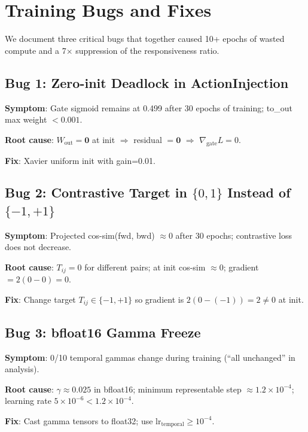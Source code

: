 \documentclass[10pt,twocolumn]{article}
\begin{document}
\section{Training Bugs and Fixes}

We document three critical bugs that together caused 10+ epochs of wasted compute and a 7$\times$ suppression of the responsiveness ratio.

\subsection{Bug 1: Zero-init Deadlock in ActionInjection}

\textbf{Symptom}: Gate sigmoid remains at 0.499 after 30 epochs of training; to\_out max weight $< 0.001$.

\textbf{Root cause}: $W_\text{out} = \mathbf{0}$ at init $\Rightarrow$ residual $= \mathbf{0}$ $\Rightarrow$ $\nabla_\text{gate} L = 0$.

\textbf{Fix}: Xavier uniform init with gain=0.01.

\subsection{Bug 2: Contrastive Target in $\{0,1\}$ Instead of $\{-1,+1\}$}

\textbf{Symptom}: Projected cos-sim(fwd, bwd) $\approx 0$ after 30 epochs; contrastive loss does not decrease.

\textbf{Root cause}: $T_{ij} = 0$ for different pairs; at init cos-sim $\approx 0$; gradient $= 2(0 - 0) = 0$.

\textbf{Fix}: Change target $T_{ij} \in \{-1, +1\}$ so gradient is $2(0-(-1)) = 2 \neq 0$ at init.

\subsection{Bug 3: bfloat16 Gamma Freeze}

\textbf{Symptom}: 0/10 temporal gammas change during training (``all unchanged'' in analysis).

\textbf{Root cause}: $\gamma \approx 0.025$ in bfloat16; minimum representable step $\approx 1.2 \times 10^{-4}$; learning rate $5 \times 10^{-6} < 1.2 \times 10^{-4}$.

\textbf{Fix}: Cast gamma tensors to float32; use $\text{lr}_\text{temporal} \geq 10^{-4}$.
\end{document}
